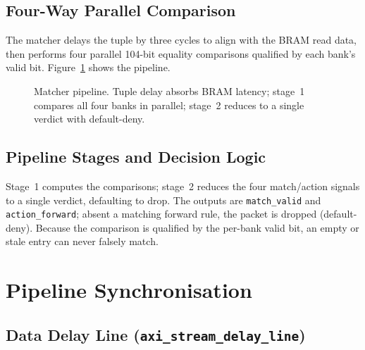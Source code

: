 \documentclass[12pt,twoside,openright]{book}
\begin{document}
\subsection{Four-Way Parallel Comparison}

The matcher delays the tuple by three cycles to align with the BRAM read data, then performs four
parallel 104-bit equality comparisons qualified by each bank's valid bit. Figure~\ref{fig:matchpipe}
shows the pipeline.

\begin{figure}[H]
\centering
\footnotesize
{}
\caption{Matcher pipeline. Tuple delay absorbs BRAM latency; stage~1 compares all four banks in
parallel; stage~2 reduces to a single verdict with default-deny.}
\label{fig:matchpipe}
\end{figure}

\subsection{Pipeline Stages and Decision Logic}

Stage~1 computes the comparisons; stage~2 reduces the four match/action signals to a single verdict,
defaulting to drop. The outputs are \texttt{match\_valid} and \texttt{action\_forward}; absent a
matching forward rule, the packet is dropped (default-deny). Because the comparison is qualified by
the per-bank valid bit, an empty or stale entry can never falsely match.

\section{Pipeline Synchronisation}

\subsection{Data Delay Line (\texttt{axi\_stream\_delay\_line})}
\end{document}
